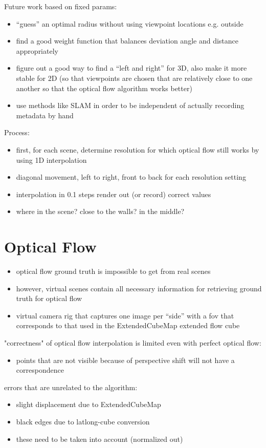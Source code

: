 Future work based on fixed params:
\begin{itemize}
  \item ``guess'' an optimal radius without using viewpoint locations e.g. outside
  \item find a good weight function that balances deviation angle and distance appropriately
  \item figure out a good way to find a ``left and right'' for 3D, also make it more stable for 2D (so that viewpoints are chosen that are relatively close to one another so that the optical flow algorithm works better)
  \item use methods like SLAM in order to be independent of actually recording metadata by hand
\end{itemize}


Process:
\begin{itemize}
  \item first, for each scene, determine resolution for which optical flow still works by using 1D interpolation 
  \item diagonal movement, left to right, front to back for each resolution setting
  \item interpolation in 0.1 steps \ar render out (or record) correct values
  \item where in the scene? close to the walls? in the middle?
\end{itemize}

\section{Optical Flow}
\begin{itemize}
  \item optical flow ground truth is impossible to get from real scenes
  \item however, virtual scenes contain all necessary information for retrieving ground truth for optical flow
  \item virtual camera rig that captures one image per ``side'' with a fov that corresponds to that used in the ExtendedCubeMap \ar extended flow cube
\end{itemize}

"correctness" of optical flow interpolation is limited even with perfect optical flow:
\begin{itemize}
   \item points that are not visible because of perspective shift will not have a correspondence
\end{itemize}
errors that are unrelated to the algorithm:
\begin{itemize}
  \item slight displacement due to ExtendedCubeMap
  \item black edges due to latlong-cube conversion
  \item these need to be taken into account (normalized out)
\end{itemize}
